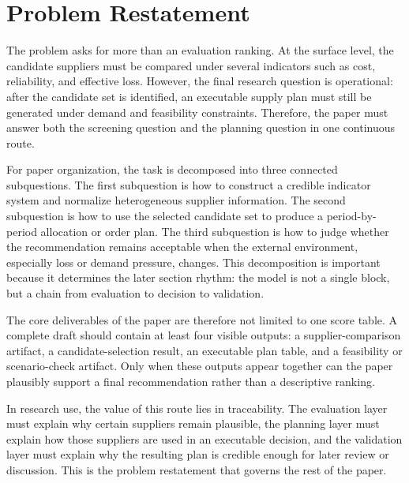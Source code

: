 \section{Problem Restatement}

The problem asks for more than an evaluation ranking. At the surface level, the candidate suppliers must be compared under several indicators such as cost, reliability, and effective loss. However, the final research question is operational: after the candidate set is identified, an executable supply plan must still be generated under demand and feasibility constraints. Therefore, the paper must answer both the screening question and the planning question in one continuous route.

For paper organization, the task is decomposed into three connected subquestions. The first subquestion is how to construct a credible indicator system and normalize heterogeneous supplier information. The second subquestion is how to use the selected candidate set to produce a period-by-period allocation or order plan. The third subquestion is how to judge whether the recommendation remains acceptable when the external environment, especially loss or demand pressure, changes. This decomposition is important because it determines the later section rhythm: the model is not a single block, but a chain from evaluation to decision to validation.

The core deliverables of the paper are therefore not limited to one score table. A complete draft should contain at least four visible outputs: a supplier-comparison artifact, a candidate-selection result, an executable plan table, and a feasibility or scenario-check artifact. Only when these outputs appear together can the paper plausibly support a final recommendation rather than a descriptive ranking.

In research use, the value of this route lies in traceability. The evaluation layer must explain why certain suppliers remain plausible, the planning layer must explain how those suppliers are used in an executable decision, and the validation layer must explain why the resulting plan is credible enough for later review or discussion. This is the problem restatement that governs the rest of the paper.
